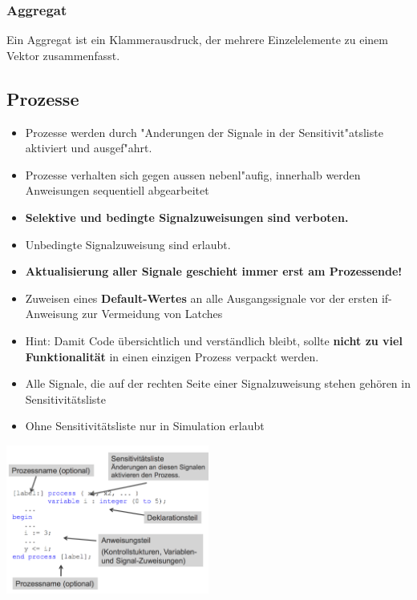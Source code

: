 		
		\subsubsection{Aggregat}
			Ein Aggregat ist ein Klammerausdruck, der mehrere Einzelelemente zu einem 
			Vektor zusammenfasst.
			\begin{multicols}{2}
			
			\end{multicols}
		

\newpage
	\subsection{Prozesse}
		\begin{multicols}{2}
			\begin{itemize}
			  \setlength{\itemsep}{1pt}
  			  \setlength{\parskip}{0pt}
  			  \setlength{\parsep}{0pt}
				\item Prozesse werden durch "Anderungen der Signale in der 	
					Sensitivit"atsliste aktiviert und ausgef"ahrt.
				\item Prozesse verhalten sich gegen aussen nebenl"aufig, innerhalb werden 
					Anweisungen sequentiell abgearbeitet
				\item \textbf{Selektive und bedingte Signalzuweisungen sind verboten.}
				\item Unbedingte Signalzuweisung sind erlaubt. 
				\item \textbf{Aktualisierung aller Signale geschieht immer erst am 
					Prozessende!}
				\item Zuweisen eines \textbf{Default-Wertes} an alle Ausgangssignale vor 	
					der ersten if-Anweisung zur Vermeidung von Latches 
				\item Hint: Damit Code übersichtlich und verständlich bleibt, sollte 	
					\textbf{nicht zu viel Funktionalität} in einen einzigen Prozess verpackt 
					werden.
				\item Alle Signale, die auf der rechten Seite einer Signalzuweisung stehen 	
					gehören in Sensitivitätsliste 
				\item Ohne Sensitivitätsliste nur in Simulation erlaubt
			\end{itemize}
			\includegraphics[width=0.5\textwidth]{pics/syntaxprozess}
		\end{multicols}
